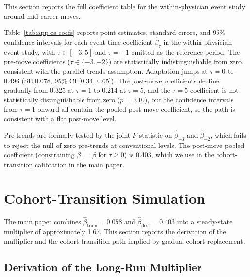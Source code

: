 \documentclass[12pt]{article}
\begin{document}
This section reports the full coefficient table for the within-physician event study around mid-career moves.

Table~\ref{tab:app-es-coefs} reports point estimates, standard errors, and 95\% confidence intervals for each event-time coefficient $\hat\beta_\tau$ in the within-physician event study, with $\tau \in [-3, 5]$ and $\tau = -1$ omitted as the reference period. The pre-move coefficients ($\tau \in \{-3, -2\}$) are statistically indistinguishable from zero, consistent with the parallel-trends assumption. Adaptation jumps at $\tau = 0$ to 0.496 (SE 0.078, 95\% CI [0.34, 0.65]). The post-move coefficients decline gradually from 0.325 at $\tau = 1$ to 0.214 at $\tau = 5$, and the $\tau = 5$ coefficient is not statistically distinguishable from zero ($p = 0.10$), but the confidence intervals from $\tau = 1$ onward all contain the pooled post-move coefficient, so the path is consistent with a flat post-move level.

Pre-trends are formally tested by the joint $F$-statistic on $\hat\beta_{-3}$ and $\hat\beta_{-2}$, which fails to reject the null of zero pre-trends at conventional levels. The post-move pooled coefficient (constraining $\beta_\tau = \beta$ for $\tau \geq 0$) is 0.403, which we use in the cohort-transition calibration in the main paper.

\section{Cohort-Transition Simulation}\label{sec:app-var}

The main paper combines $\hat\beta_{\text{train}} = 0.058$ and $\hat\beta_{\text{dest}} = 0.403$ into a steady-state multiplier of approximately 1.67. This section reports the derivation of the multiplier and the cohort-transition path implied by gradual cohort replacement.

\subsection{Derivation of the Long-Run Multiplier}
\end{document}
